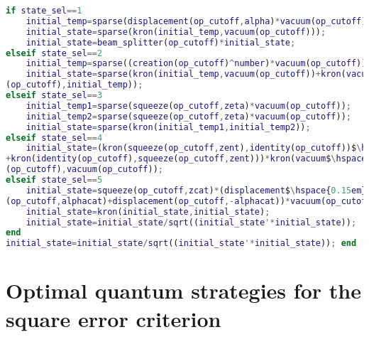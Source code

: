 \begin{lstlisting}[language=Matlab, mathescape=true]
% Initial state
if state_sel==1
    initial_temp=sparse(displacement(op_cutoff,alpha)*vacuum(op_cutoff));
    initial_state=sparse(kron(initial_temp,vacuum(op_cutoff)));
    initial_state=beam_splitter(op_cutoff)*initial_state;
elseif state_sel==2
    initial_temp=sparse((creation(op_cutoff)^number)*vacuum(op_cutoff));
    initial_state=sparse(kron(initial_temp,vacuum(op_cutoff))+kron(vacuum$\hspace{0.15em}\swarrow$
(op_cutoff),initial_temp));
elseif state_sel==3
    initial_temp1=sparse(squeeze(op_cutoff,zeta)*vacuum(op_cutoff));
    initial_temp2=sparse(squeeze(op_cutoff,zeta)*vacuum(op_cutoff));
    initial_state=sparse(kron(initial_temp1,initial_temp2));
elseif state_sel==4
    initial_state=(kron(squeeze(op_cutoff,zent),identity(op_cutoff))$\hspace{0.15em}\swarrow$         	
+kron(identity(op_cutoff),squeeze(op_cutoff,zent)))*kron(vacuum$\hspace{0.15em}\swarrow$
(op_cutoff),vacuum(op_cutoff));
elseif state_sel==5
    initial_state=squeeze(op_cutoff,zcat)*(displacement$\hspace{0.15em}\swarrow$
(op_cutoff,alphacat)+displacement(op_cutoff,-alphacat))*vacuum(op_cutoff);
    initial_state=kron(initial_state,initial_state);
    initial_state=initial_state/sqrt((initial_state'*initial_state));
end
initial_state=initial_state/sqrt((initial_state'*initial_state)); end
\end{lstlisting}

\section{Optimal quantum strategies for the square error criterion}
\label{sec:singleshotalgorithm}

